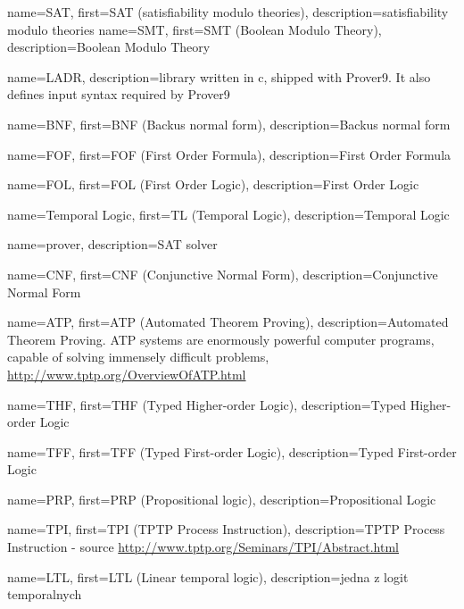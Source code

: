 
 {
    name=SAT,
    first={SAT (satisfiability modulo theories)},
    description={satisfiability modulo theories}
}
 {
    name=SMT,
    first={SMT (Boolean Modulo Theory)},
    description={Boolean Modulo Theory}
}

 {
    name=LADR,
    description={library written in c, shipped with Prover9. It also defines input syntax required by Prover9}
}

 {
    name=BNF,
    first={BNF (Backus normal form)},
    description={Backus normal form}
}

 {
    name=FOF,
    first={FOF (First Order Formula)},
    description={First Order Formula}
}

 {
    name=FOL,
    first={FOL (First Order Logic)},
    description={First Order Logic}
}

 {
    name={Temporal Logic},
    first={TL (Temporal Logic)},
    description={Temporal Logic}
}

 {
    name=prover,
    description={SAT solver}
}

 {
    name=CNF,
    first={CNF (Conjunctive Normal Form)},
    description={Conjunctive Normal Form}
}

 {
    name=ATP,
    first={ATP (Automated Theorem Proving)},
    description={Automated Theorem Proving. ATP systems are enormously powerful computer programs, capable of solving immensely difficult problems, \url{http://www.tptp.org/OverviewOfATP.html}}
}

 {
    name=THF,
    first={THF (Typed Higher-order Logic)},
    description={Typed Higher-order Logic}
}

 {
    name=TFF,
    first={TFF (Typed First-order Logic)},
    description={Typed First-order Logic}
}

 {
    name={PRP},
    first={PRP (Propositional logic)},
    description={Propositional Logic}
}

 {
    name=TPI,
    first={TPI (TPTP Process Instruction)},
    description={TPTP Process Instruction - source \url{http://www.tptp.org/Seminars/TPI/Abstract.html}}
}

 {
    name=LTL,
    first={LTL (Linear temporal logic)},
    description={jedna z logit temporalnych}
}


